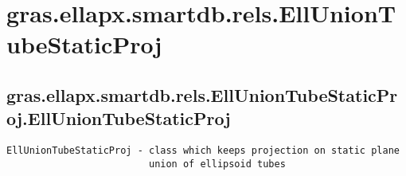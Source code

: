 \section{gras.ellapx.smartdb.rels.EllUnionTubeStaticProj}\label{secClassDescr:gras.ellapx.smartdb.rels.EllUnionTubeStaticProj}
\subsection{\texorpdfstring{gras.ellapx.smartdb.rels.EllUnionTubeStaticProj.EllUnionTubeStaticProj}{EllUnionTubeStaticProj}}\label{method:gras.ellapx.smartdb.rels.EllUnionTubeStaticProj.EllUnionTubeStaticProj}
\begin{verbatim}
EllUnionTubeStaticProj - class which keeps projection on static plane
                         union of ellipsoid tubes


\end{verbatim}
